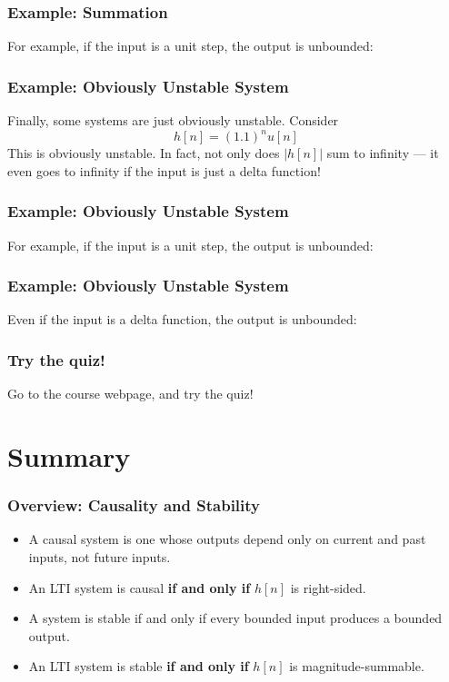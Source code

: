 \documentclass{beamer}
\begin{document}
\begin{frame}
  \frametitle{Example: Summation}

  For example, if the input is a unit step, the output is unbounded:
  \centerline{}
\end{frame}

\begin{frame}
  \frametitle{Example: Obviously Unstable System}

  Finally, some systems are just obviously unstable.  Consider
  \begin{displaymath}
    h[n] = (1.1)^n u[n]
  \end{displaymath}
  This is obviously unstable.  In fact, not only does $|h[n]|$ sum to
  infinity --- it even goes to infinity if the input is just a delta function!
\end{frame}

\begin{frame}
  \frametitle{Example: Obviously Unstable System}

  For example, if the input is a unit step, the output is unbounded:
  \centerline{}
\end{frame}

\begin{frame}
  \frametitle{Example: Obviously Unstable System}

  Even if the input is a delta function, the output is unbounded:
  \centerline{}
\end{frame}

\begin{frame}
  \frametitle{Try the quiz!}
  Go to the course webpage, and try the quiz!
\end{frame}

\section[Summary]{Summary}
\setcounter{subsection}{1}

\begin{frame}
  \frametitle{Overview: Causality and Stability}

  \begin{itemize}
  \item A causal system is one whose outputs depend only on
    current and past inputs, not future inputs.
  \item An LTI system is causal \textbf{if and only if} $h[n]$ is
    right-sided.
  \item A system is stable if and only if every bounded input produces
    a bounded output.
  \item An LTI system is stable \textbf{if and only if} $h[n]$ is
    magnitude-summable.
  \end{itemize}
\end{frame}
\end{document}
